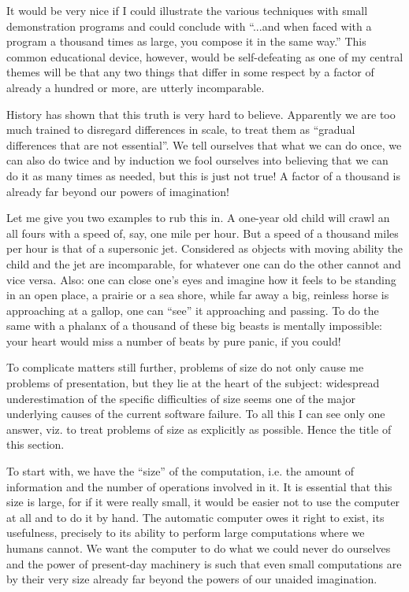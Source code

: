 It would be very nice if I could illustrate the various techniques with small demonstration programs and could conclude with ``...and when faced with a program a thousand times as large, you compose it in the same way.'' This common educational device, however, would be self-defeating as one of my central themes will be that any two things that differ in some respect by a factor of already a hundred or more, are utterly incomparable.

History has shown that this truth is very hard to believe. Apparently we are too much trained to disregard differences in scale, to treat them as ``gradual differences that are not essential''. We tell ourselves that what we can do once, we can also do twice and by induction we fool ourselves into believing that we can do it as many times as needed, but this is just not true! A factor of a thousand is already far beyond our powers of imagination!

Let me give you two examples to rub this in. A one-year old child will crawl an all fours with a speed of, say, one mile per hour. But a speed of a thousand miles per hour is that of a supersonic jet. Considered as objects with moving ability the child and the jet are incomparable, for whatever one can do the other cannot and vice versa. Also: one can close one’s eyes and imagine how it feels to be standing in an open place, a prairie or a sea shore, while far away a big, reinless horse is approaching at a gallop, one can ``see'' it approaching and passing. To do the same with a phalanx of a thousand of these big beasts is mentally impossible: your heart would miss a number of beats by pure panic, if you could!

To complicate matters still further, problems of size do not only cause me problems of presentation, but they lie at the heart of the subject: widespread underestimation of the specific difficulties of size seems one of the major underlying causes of the current software failure. To all this I can see only one answer, viz. to treat problems of size as explicitly as possible. Hence the title of this section.

To start with, we have the “size” of the computation, i.e. the amount of information and the number of operations involved in it. It is essential that this size is large, for if it were really small, it would be easier not to use the computer at all and to do it by hand. The automatic computer owes it right to exist, its usefulness, precisely to its ability to perform large computations where we humans cannot. We want the computer to do what we could never do ourselves and the power of present-day machinery is such that even small computations are by their very size already far beyond the powers of our unaided imagination.

